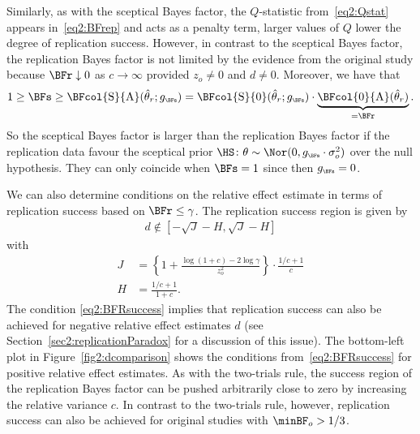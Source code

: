 Similarly, as with the sceptical Bayes factor, the $Q$-statistic
from~\eqref{eq2:Qstat} appears in~\eqref{eq2:BFrep} and acts as a penalty term,
\ie{} larger values of $Q$ lower the degree of replication success. However, in
contrast to the sceptical Bayes factor, the replication Bayes factor is not
limited by the evidence from the original study because $\BFr \downarrow 0$ as
$c \to \infty$ provided $z_{o} \neq 0$ and $d \neq 0$. Moreover, we have that
\begin{align*}
  1 \geq \BFs \geq \BFcol{\mathrm{S}}{\mathrm{A}}(\hat{\theta}_r; g_{\scriptscriptstyle \BFs})
  = \BFcol{\mathrm{S}}{0}(\hat{\theta}_r; g_{\scriptscriptstyle \BFs}) \cdot \underbrace{\BFcol{0}{\mathrm{A}}(\hat{\theta}_r)}_{= \BFr}.
\end{align*}
So the sceptical Bayes factor is larger than the replication Bayes factor if the
replication data favour the sceptical prior
$\HS \colon \theta \sim \Nor(0, g_{\scriptscriptstyle \BFs} \cdot \sigma^{2}_{o})$
over the null hypothesis. They can only coincide when $\BFs = 1$ since then
$g_{\scriptscriptstyle \BFs} = 0$.

We can also determine conditions on the relative effect estimate in terms of
replication success based on $\BFr \leq \gamma$. The replication success region
is given by
\begin{align}
  \label{eq2:BFRsuccess}
  d \not\in [-\sqrt{J} - H, \sqrt{J} - H]
\end{align}
with
\begin{align*}
  J &= \left\{1 + \frac{\log(1 + c) - 2 \log \gamma}{z_o^2}\right\} \cdot
  \frac{1/c + 1}{c} \\
  H &= \frac{1/c + 1}{1 + c}.
\end{align*}
The condition \eqref{eq2:BFRsuccess} implies that replication success can also be
achieved for negative relative effect estimates $d$ (see
Section~\ref{sec2:replicationParadox} for a discussion of this issue). The
bottom-left plot in Figure~\ref{fig2:dcomparison} shows the conditions
from~\eqref{eq2:BFRsuccess} for positive relative effect estimates. As with the
two-trials rule, the success region of the replication Bayes factor can be
pushed arbitrarily close to zero by increasing the relative variance $c$. In
contrast to the two-trials rule, however, replication success can also be
achieved for original studies with $\minBF_{o} > 1/3$.

